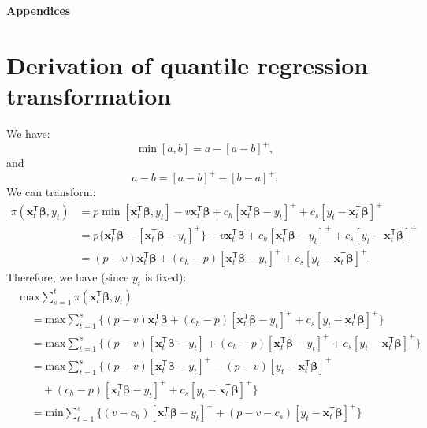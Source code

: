 \documentclass{article}
\begin{document}
\printbibliography

\newpage
\begin{center}
{\bf\Large Appendices}
\end{center}

\appendix





\section{Derivation of quantile regression transformation}\label{app:A}
We have:
\[
    \min[a,b]=a-[a-b]^+,
\]
and
\[
    a-b=[a-b]^+-[b-a]^+.
\]
We can transform:
\[
    \begin{aligned}
        \pi(\mathbf{x}_t^{\mathsf{T}}\boldsymbol{\beta},y_t)
        &=p\min[\mathbf{x}_t^{\mathsf{T}}\boldsymbol{\beta},y_t]-v\mathbf{x}_t^{\mathsf{T}}\boldsymbol{\beta}+c_h[\mathbf{x}_t^{\mathsf{T}}\boldsymbol{\beta}-y_t]^++c_s[y_t-\mathbf{x}_t^{\mathsf{T}}\boldsymbol{\beta}]^+\\
        &=p\{\mathbf{x}_t^{\mathsf{T}}\boldsymbol{\beta}-[\mathbf{x}_t^{\mathsf{T}}\boldsymbol{\beta}-y_t]^+\}-v\mathbf{x}_t^{\mathsf{T}}\boldsymbol{\beta}+c_h[\mathbf{x}_t^{\mathsf{T}}\boldsymbol{\beta}-y_t]^++c_s[y_t-\mathbf{x}_t^{\mathsf{T}}\boldsymbol{\beta}]^+\\
        &=(p-v)\mathbf{x}_t^{\mathsf{T}}\boldsymbol{\beta}+(c_h-p)[\mathbf{x}_t^{\mathsf{T}}\boldsymbol{\beta}-y_t]^++c_s[y_t-\mathbf{x}_t^{\mathsf{T}}\boldsymbol{\beta}]^+.
    \end{aligned}
\]
Therefore, we have (since $y_t$ is fixed):
\[
    \begin{aligned}
        &\text{max}\displaystyle\sum_{s=1}^t{\pi(\mathbf{x}_t^{\mathsf{T}}\boldsymbol{\beta},y_t)}\\
        &\quad=\text{max}\displaystyle\sum_{t=1}^s\{(p-v)\mathbf{x}_t^{\mathsf{T}}\boldsymbol{\beta}+(c_h-p)[\mathbf{x}_t^{\mathsf{T}}\boldsymbol{\beta}-y_t]^++c_s[y_t-\mathbf{x}_t^{\mathsf{T}}\boldsymbol{\beta}]^+\}\\
        &\quad=\text{max}\displaystyle\sum_{t=1}^s\{(p-v)[\mathbf{x}_t^{\mathsf{T}}\boldsymbol{\beta}-y_t]+(c_h-p)[\mathbf{x}_t^{\mathsf{T}}\boldsymbol{\beta}-y_t]^++c_s[y_t-\mathbf{x}_t^{\mathsf{T}}\boldsymbol{\beta}]^+\}\\
        &\quad=\text{max}\displaystyle\sum_{t=1}^s\{(p-v)[\mathbf{x}_t^{\mathsf{T}}\boldsymbol{\beta}-y_t]^+-(p-v)[y_t-\mathbf{x}_t^{\mathsf{T}}\boldsymbol{\beta}]^+\\
        &\qquad+(c_h-p)[\mathbf{x}_t^{\mathsf{T}}\boldsymbol{\beta}-y_t]^++c_s[y_t-\mathbf{x}_t^{\mathsf{T}}\boldsymbol{\beta}]^+\}\\
        &\quad=\text{min}\displaystyle\sum_{t=1}^s\{(v-c_h)[\mathbf{x}_t^{\mathsf{T}}\boldsymbol{\beta}-y_t]^++(p-v-c_s)[y_t-\mathbf{x}_t^{\mathsf{T}}\boldsymbol{\beta}]^+\}
    \end{aligned}
\]
\end{document}
